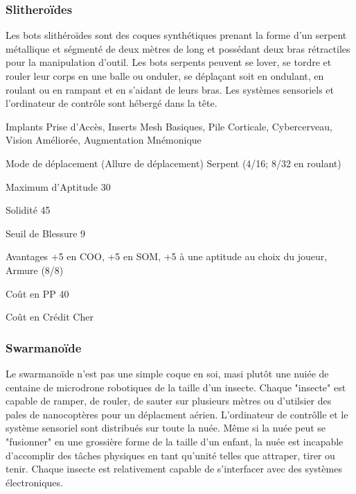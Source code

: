 \subsubsection{Slitheroïdes} \label{sec:starting-slitheroids} 

Les bots slithéroïdes sont des coques synthétiques prenant la forme d'un serpent métallique et ségmenté de deux mètres de long et possédant deux bras rétractiles pour la manipulation d'outil. Les bots serpents peuvent se lover, se tordre et rouler leur corps en une balle ou onduler, se déplaçant soit en ondulant, en roulant ou en rampant et en s'aidant de leurs bras. Les systèmes sensoriels et l'ordinateur de contrôle sont hébergé dans la tête. 

\begin{description*} \item[Implants] Prise d'Accès, Inserts Mesh Basiques, Pile Corticale, Cybercerveau, Vision Améliorée, Augmentation Mnémonique\item[Mode de déplacement](Allure de déplacement) Serpent (4/16; 8/32 en roulant)\item[Maximum d'Aptitude] 30 \item[Solidité] 45 \item[Seuil de Blessure] 9 \item[Avantages] +5 en COO, +5 en SOM, +5 à une aptitude au choix du joueur, Armure (8/8) \item[Coût en PP] 40 \item[Coût en Crédit] Cher \end{description*} 

\subsubsection{Swarmanoïde} \label{sec:starting-swarmanoid} 

Le swarmanoïde n'est pas une simple coque en soi, masi plutôt une nuiée de centaine de microdrone robotiques de la taille d'un insecte. Chaque "insecte" est capable de ramper, de rouler, de sauter sur plusieurs mètres ou d'utilsier des pales de nanocoptères pour un déplacment aérien. L'ordinateur de contrôlle et le système sensoriel sont distribués sur toute la nuée. Même si la nuée peut se "fusionner" en une grossière forme de la taille d'un enfant, la nuée est incapable d'accomplir des tâches physiques en tant qu'unité telles que attraper, tirer ou tenir. Chaque insecte est relativement capable de s'interfacer avec des systèmes électroniques. 

